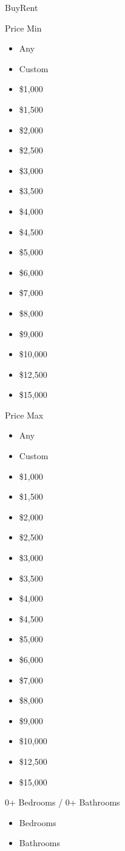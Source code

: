 BuyRent

Price Min

\begin{itemize}
\tightlist
\item
  Any
\item
  Custom
\item
  \$1,000
\item
  \$1,500
\item
  \$2,000
\item
  \$2,500
\item
  \$3,000
\item
  \$3,500
\item
  \$4,000
\item
  \$4,500
\item
  \$5,000
\item
  \$6,000
\item
  \$7,000
\item
  \$8,000
\item
  \$9,000
\item
  \$10,000
\item
  \$12,500
\item
  \$15,000
\end{itemize}

Price Max

\begin{itemize}
\tightlist
\item
  Any
\item
  Custom
\item
  \$1,000
\item
  \$1,500
\item
  \$2,000
\item
  \$2,500
\item
  \$3,000
\item
  \$3,500
\item
  \$4,000
\item
  \$4,500
\item
  \$5,000
\item
  \$6,000
\item
  \$7,000
\item
  \$8,000
\item
  \$9,000
\item
  \$10,000
\item
  \$12,500
\item
  \$15,000
\end{itemize}

0+ Bedrooms / 0+ Bathrooms

\begin{itemize}
\tightlist
\item
  Bedrooms
\item
  Bathrooms
\end{itemize}

